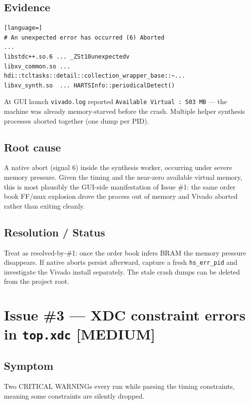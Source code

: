 \documentclass[11pt,a4paper]{article}
\newcommand{\sev}[1]{%
  \ifstrequal{#1}{HIGH}{\textcolor{sev-high}{\textbf{[HIGH]}}}{%
  \ifstrequal{#1}{MED}{\textcolor{sev-med}{\textbf{[MEDIUM]}}}{%
  \textcolor{sev-low}{\textbf{[LOW]}}}}}
\begin{document}
\subsection{Evidence}
\begin{lstlisting}[language=]
# An unexpected error has occurred (6) Aborted
...
libstdc++.so.6 ... _ZSt10unexpectedv
libxv_common.so ... hdi::tcltasks::detail::collection_wrapper_base::~...
libxv_synth.so  ... HARTSInfo::periodicalDetect()
\end{lstlisting}
At GUI launch \texttt{vivado.log} reported \texttt{Available Virtual : 503 MB} —
the machine was already memory-starved before the crash. Multiple helper
synthesis processes aborted together (one dump per PID).

\subsection{Root cause}
A native abort (signal 6) inside the synthesis worker, occurring under severe
memory pressure. Given the timing and the near-zero available virtual memory,
this is most plausibly the GUI-side manifestation of Issue \#1: the same order
book FF/mux explosion drove the process out of memory and Vivado aborted rather
than exiting cleanly.

\subsection{Resolution / Status}
Treat as resolved-by-\#1: once the order book infers BRAM the memory pressure
disappears. If native aborts persist afterward, capture a fresh
\texttt{hs\_err\_pid} and investigate the Vivado install separately. The stale
crash dumps can be deleted from the project root.

\section{Issue \#3 — XDC constraint errors in \texttt{top.xdc} \sev{MED}}

\subsection{Symptom}
Two CRITICAL WARNINGs every run while parsing the timing constraints, meaning
some constraints are silently dropped.
\end{document}
